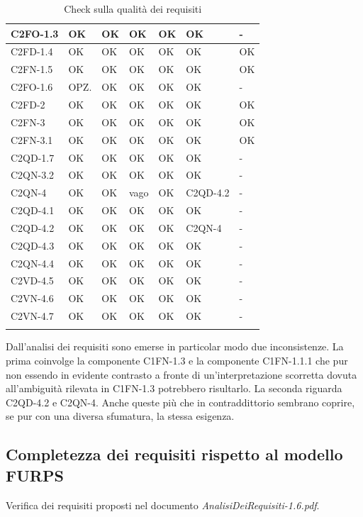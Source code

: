 \begin{longtable}{|p{}|p{2cm}|p{2cm}|p{2cm}|p{2cm}|p{}|p{2cm}|}
 C2FO-1.3&  OK&  OK&  OK&  OK&  OK& -\\ \hline
 C2FD-1.4&  OK&  OK&  OK&  OK&  OK& OK\\ \hline
 C2FN-1.5&  OK&  OK&  OK&  OK&  OK& OK\\ \hline
 C2FO-1.6&  OPZ.&  OK&  OK&  OK&  OK& -\\ \hline
 C2FD-2&  OK&  OK&  OK&  OK&  OK& OK\\ \hline
 C2FN-3&  OK&  OK&  OK&  OK&  OK& OK\\ \hline
 C2FN-3.1&  OK&  OK&  OK&  OK&  OK& OK\\ \hline
 C2QD-1.7&  OK&  OK&  OK&  OK&  OK& -\\ \hline
 C2QN-3.2&  OK&  OK&  OK&  OK&  OK& -\\ \hline
 C2QN-4&  OK&  OK&  vago&  OK&  C2QD-4.2& -\\ \hline
 C2QD-4.1&  OK&  OK&  OK&  OK&  OK& -\\ \hline
 C2QD-4.2&  OK&  OK&  OK&  OK&  C2QN-4& -\\ \hline
 C2QD-4.3&  OK&  OK&  OK&  OK&  OK& -\\ \hline
 C2QN-4.4& OK&  OK&  OK&  OK&  OK& -\\ \hline
 C2VD-4.5&  OK&  OK&  OK&  OK&  OK& -\\ \hline
 C2VN-4.6&  OK&  OK&  OK&  OK&  OK& -\\ \hline
 C2VN-4.7&  OK&  OK&  OK&  OK&  OK& -\\ \hline
 
\caption{Check sulla qualit\`a dei requisiti}
\end{longtable}

Dall'analisi dei requisiti sono emerse in particolar modo due inconsistenze. La
prima coinvolge la componente C1FN-1.3 e la componente C1FN-1.1.1 che pur non
essendo in evidente contrasto a fronte di un'interpretazione scorretta dovuta
all'ambiguit\`a rilevata in C1FN-1.3 potrebbero risultarlo.
La seconda riguarda C2QD-4.2 e C2QN-4. Anche queste pi\`u che in contraddittorio
sembrano coprire, se pur con una diversa sfumatura, la stessa esigenza.


\subsection*{Completezza dei requisiti rispetto al modello FURPS}

Verifica dei requisiti proposti nel documento
\emph{AnalisiDeiRequisiti-1.6.pdf}.



